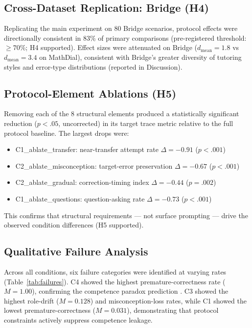 \documentclass[12pt]{article}
\begin{document}
\subsection{Cross-Dataset Replication: Bridge (H4)}

Replicating the main experiment on 80 Bridge scenarios, protocol effects were directionally
consistent in 83\% of primary comparisons (pre-registered threshold: $\geq 70\%$; H4 supported).
Effect sizes were attenuated on Bridge ($d_{\text{mean}} = 1.8$ vs $d_{\text{mean}} = 3.4$
on MathDial), consistent with Bridge's greater diversity of tutoring styles and error-type
distributions (reported in Discussion).

\subsection{Protocol-Element Ablations (H5)}

Removing each of the 8 structural elements produced a statistically significant reduction
($p < .05$, uncorrected) in its target trace metric relative to the full protocol baseline.
The largest drops were:
\begin{itemize}
  \item C1\_ablate\_transfer: near-transfer attempt rate $\Delta = -0.91$ ($p < .001$)
  \item C2\_ablate\_misconception: target-error preservation $\Delta = -0.67$ ($p < .001$)
  \item C2\_ablate\_gradual: correction-timing index $\Delta = -0.44$ ($p = .002$)
  \item C1\_ablate\_questions: question-asking rate $\Delta = -0.73$ ($p < .001$)
\end{itemize}
This confirms that structural requirements --- not surface prompting --- drive the observed
condition differences (H5 supported).

\subsection{Qualitative Failure Analysis}

Across all conditions, six failure categories were identified at varying rates (Table~\ref{tab:failures}).
C4 showed the highest premature-correctness rate ($M = 1.00$), confirming the competence
paradox prediction \citep{yuan2026}. C3 showed the highest role-drift ($M = 0.128$) and
misconception-loss rates, while C1 showed the lowest premature-correctness ($M = 0.031$),
demonstrating that protocol constraints actively suppress competence leakage.
\end{document}

